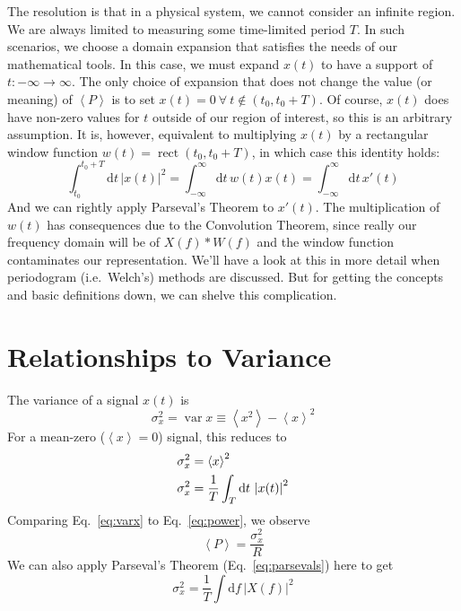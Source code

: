 \documentclass{article}
\newcommand{\dd}[1]{\mathrm{d}#1\,}
\newcommand{\Avg}[1]{\left< #1 \right>}
\DeclareMathOperator{\vvar}{var}
\DeclareMathOperator{\rect}{rect}
\begin{document}
The resolution is that in a physical system, we cannot consider an infinite
region. We are always limited to measuring some time-limited period \(T\).
In such scenarios, we choose a domain expansion that satisfies the needs of
our mathematical tools. In this case, we must expand \(x(t)\) to have a
support of \(t: -\infty\to\infty\). The only choice of expansion that does
not change the value (or meaning) of \(\Avg{P}\) is to set
\(x(t) = 0\ \forall\ t \notin (t_0, t_0+T)\). Of course, \(x(t)\) does have
non-zero values for \(t\) outside of our region of interest, so this is
an arbitrary assumption. It is, however, equivalent to multiplying \(x(t)\)
by a rectangular window function \(w(t)=\rect{\left(t_0, t_0+T\right)}\), in which case
this identity holds:
%
\begin{equation}
    \int_{t_0}^{t_0+T} \dd{t} \left|x(t)\right|^2 
    = \int_{-\infty}^{\infty} \dd{t} w(t) x(t)
    = \int_{-\infty}^{\infty} \dd{t} x'(t)
\end{equation}
%
And we can rightly apply Parseval's Theorem to \(x'(t)\). The multiplication of
\(w(t)\) has consequences due to the Convolution Theorem, since really our
frequency domain will be of \(X(f)\ast W(f)\) and the window function
contaminates our representation. We'll have a look at this in more detail
when periodogram (i.e.~Welch's) methods are discussed. But for getting the
concepts and basic definitions down, we can shelve this complication.

\section{Relationships to Variance}\label{appendix:variance}

The variance of a signal \(x(t)\) is
%
\begin{equation*}
    \sigma_x^2 = \vvar{x} \equiv \Avg{x^2} - \Avg{x}^2
\end{equation*}
%
For a mean-zero (\(\Avg{x}=0\)) signal, this reduces to
%
\begin{align}
    \sigma_x^2 & = \Avg{x}^2 \notag\\
    \sigma_x^2 & = \frac{1}{T} \int_T \dd{t} \left|x(t)\right|^2 \label{eq:varx}
\end{align}
%
Comparing Eq.~\eqref{eq:varx} to Eq.~\eqref{eq:power}, we observe
%
\begin{equation}
    \Avg{P} = \frac{\sigma_x^2}{R} \label{eq:x2overR}
\end{equation}
%
We can also apply Parseval's Theorem (Eq.~\eqref{eq:parsevals}) here to get
%
\begin{equation}
    \sigma_x^2 = \frac{1}{T} \int \dd{f} \left|X(f)\right|^2 \label{eq:varxfdomain}
\end{equation}
\end{document}
